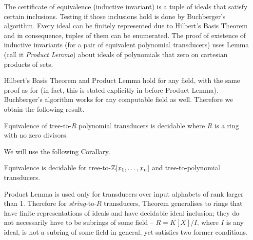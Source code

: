 The certificate of equivalence (inductive invariant) is a tuple of ideals that satisfy certain inclusions. Testing if those inclusions hold is done by Buchberger's algorithm. Every ideal can be finitely represented due to Hilbert's Basis Theorem and in consequence, tuples of them can be enumerated.
The proof of existence of inductive invariants (for a pair of equivalent polynomial transducers) uses Lemma \cite[6.3]{seidlManethKemper2018} (call it \emph{Product Lemma}) about ideals of polynomials that zero on cartesian products of sets.

Hilbert's Basis Theorem and Product Lemma hold for any field, with the same proof as for \Q (in fact, this is stated explicitly in \cite{seidlManethKemper2018} before Product Lemma). Buchberger's algorithm works for any computable field as well.
Therefore we obtain the following result.
\begin{theorem}\label{thm:equivalence-polynomial-automata-over-a-ring}
	Equivalence of tree-to-$R$ polynomial transducers is decidable where $R$ is a ring with no zero divisors.
\end{theorem}
We will use the following Corallary.
\begin{corollary}\label{cor:equivalence-pol-transducers-Zrat}
	Equivalence is decidable for tree-to-$\mathbb{Z}[x_{1}, \ldots, x_{n}]$ and tree-to-\Zrat polynomial transducers.
\end{corollary}
\begin{remark}
Product Lemma is used only for transducers over input alphabets of rank larger than 1. Therefore for \emph{string}-to-$R$ transducers, Theorem generalises to rings that have finite representations of ideals and have decidable ideal inclusion; they do not necessarily have to be subrings of some field -- $R = K[X]/I$, where $I$ is any ideal, is not a subring of some field in general, yet satisfies two former conditions.
\end{remark}